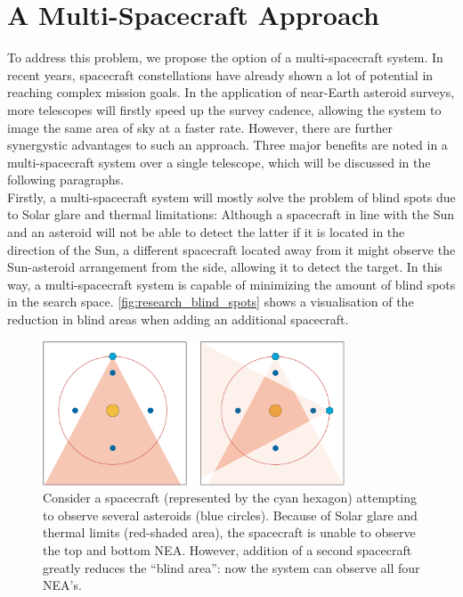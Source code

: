\section{A Multi-Spacecraft Approach}
\label{sec:researchmultispacecraft}
To address this problem, we propose the option of a multi-spacecraft system. In recent years, spacecraft constellations have already shown a lot of potential in reaching complex mission goals. In the application of near-Earth asteroid surveys, more telescopes will firstly speed up the survey cadence, allowing the system to image the same area of sky at a faster rate. However, there are further synergystic advantages to such an approach. Three major benefits are noted in a multi-spacecraft system over a single telescope, which will be discussed in the following paragraphs.\\

Firstly, a multi-spacecraft system will mostly solve the problem of blind spots due to Solar glare and thermal limitations: Although a spacecraft in line with the Sun and an asteroid will not be able to detect the latter if it is located in the direction of the Sun, a different spacecraft located away from it might observe the Sun-asteroid arrangement from the side, allowing it to detect the target. In this way, a multi-spacecraft system is capable of minimizing the amount of blind spots in the search space. \autoref{fig:research_blind_spots} shows a visualisation of the reduction in blind areas when adding an additional spacecraft.\\

\begin{figure}[htbp]
 \centering
 \includegraphics[width=0.8\textwidth]{img/research_blind_spots.png}
 \caption{Consider a spacecraft (represented by the cyan hexagon) attempting to observe several asteroids (blue circles). Because of Solar glare and thermal limits (red-shaded area), the spacecraft is unable to observe the top and bottom NEA. However, addition of a second spacecraft greatly reduces the ``blind area'': now the system can observe all four NEA's.}
 \label{fig:research_blind_spots}
\end{figure}


